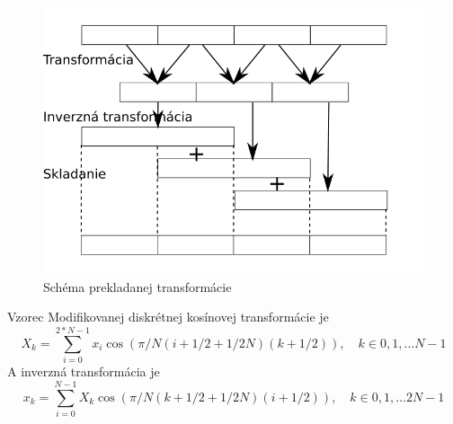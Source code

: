 \begin{figure}[htp]
    \centering
    \includegraphics{obrazky/informatika/audio/lapped_transform}
    \caption{Schéma prekladanej transformácie}
    \label{fig:lapped_transform}
\end{figure}

Vzorec Modifikovanej diskrétnej kosínovej transformácie je
\begin{equation}
  X_k = \sum_{i=0}^{2*N-1} x_i 
            \cos(\pi /N (i + 1/2 + 1/2 N) (k + 1/2)),
            \quad k \in 0,1,\dots N-1
\end{equation}
A inverzná transformácia je
\begin{equation}
  x_k = \sum_{i=0}^{N-1} X_k 
            \cos (\pi/N (k + 1/2 + 1/2 N) (i + 1/2)),
            \quad k \in 0,1,\dots 2N-1
\end{equation}


